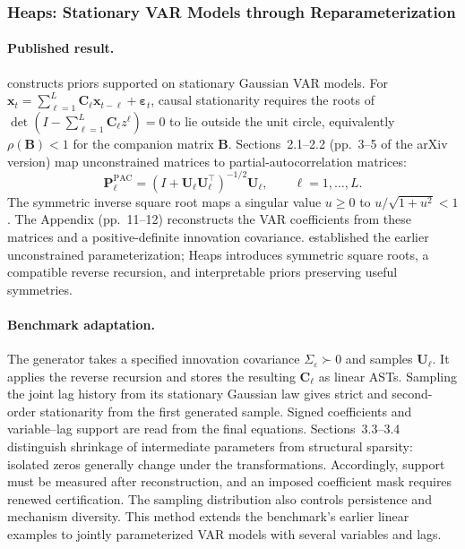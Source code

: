 \subsubsection{Heaps: Stationary VAR Models through Reparameterization}
\label{sec:heaps-var}

\paragraph{Published result.}
\citet{heaps2023stationarity} constructs priors supported on stationary Gaussian
VAR models. For $\mathbf{x}_t=\sum_{\ell=1}^{L}\mathbf C_\ell
\mathbf{x}_{t-\ell}+\boldsymbol\varepsilon_t$, causal stationarity requires
the roots of \mbox{$\det(I-\sum_{\ell=1}^{L}\mathbf C_\ell z^\ell)=0$} to lie
outside the unit circle, equivalently $\rho(\mathbf B)<1$ for the companion
matrix $\mathbf B$. Sections~2.1--2.2 (pp.~3--5 of the arXiv version) map
unconstrained matrices to partial-autocorrelation matrices:
\begin{equation}
 \mathbf P_\ell^{\mathrm{PAC}}
 =\left(I+\mathbf U_\ell\mathbf U_\ell^\top\right)^{-1/2}\mathbf U_\ell,
 \qquad \ell=1,\ldots,L.
\label{eq:heaps-pac-map}
\end{equation}
The symmetric inverse square root maps a singular value $u\geq0$ to
$u/\sqrt{1+u^2}<1$. The Appendix (pp.~11--12) reconstructs the VAR coefficients
from these matrices and a positive-definite innovation covariance.
\citet{ansley1986reparameterizing} established the earlier unconstrained
parameterization; Heaps introduces symmetric square roots, a compatible
reverse recursion, and interpretable priors preserving useful symmetries.

\paragraph{Benchmark adaptation.}
The generator takes a specified innovation covariance
$\Sigma_{\varepsilon}\succ0$ and samples $\mathbf U_\ell$. It applies the
reverse recursion and stores the resulting $\mathbf C_\ell$ as linear ASTs.
Sampling the joint lag history from its stationary Gaussian law gives strict
and second-order stationarity from the first generated sample. Signed
coefficients and variable--lag support are read from the final equations.
Sections~3.3--3.4 distinguish shrinkage of intermediate parameters from
structural sparsity: isolated zeros generally change under the transformations.
Accordingly, support must be measured after reconstruction, and an imposed
coefficient mask requires renewed certification. The sampling distribution
also controls persistence and mechanism diversity. This method extends the
benchmark's earlier linear examples to jointly parameterized VAR models
with several variables and lags.
